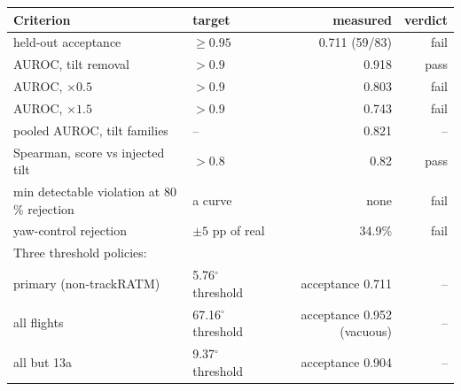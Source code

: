 \begin{tabular}{llrr}
\toprule
Criterion & target & measured & verdict \\
\midrule
held-out acceptance & $\geq 0.95$ & 0.711 (59/83) & fail \\
AUROC, tilt removal & $>0.9$ & 0.918 & pass \\
AUROC, $\times 0.5$ & $>0.9$ & 0.803 & fail \\
AUROC, $\times 1.5$ & $>0.9$ & 0.743 & fail \\
pooled AUROC, tilt families & -- & 0.821 & -- \\
Spearman, score vs injected tilt & $>0.8$ & 0.82 & pass \\
min detectable violation at 80\,\% rejection & a curve & none & fail \\
yaw-control rejection & $\pm5$ pp of real & 34.9\% & fail \\
\midrule
\multicolumn{4}{l}{\footnotesize Three threshold policies:} \\
primary (non-trackRATM) & 5.76$^\circ$ threshold & acceptance 0.711 & -- \\
all flights & 67.16$^\circ$ threshold & acceptance 0.952 (vacuous) & -- \\
all but 13a & 9.37$^\circ$ threshold & acceptance 0.904 & -- \\
\bottomrule
\end{tabular}
